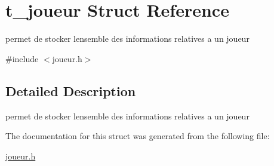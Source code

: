 \hypertarget{structt__joueur}{}\section{t\+\_\+joueur Struct Reference}
\label{structt__joueur}


permet de stocker l\textquotesingle{}ensemble des informations relatives a un joueur  




{\ttfamily \#include $<$joueur.\+h$>$}



\subsection{Detailed Description}
permet de stocker l\textquotesingle{}ensemble des informations relatives a un joueur 

The documentation for this struct was generated from the following file\+:\begin{DoxyCompactItemize}
\item 
\hyperlink{joueur_8h}{joueur.\+h}\end{DoxyCompactItemize}
